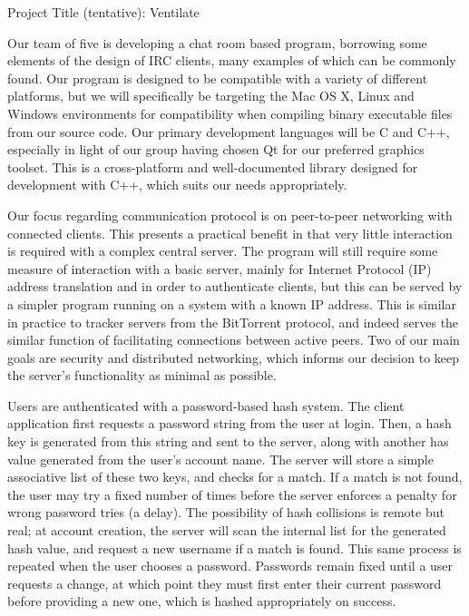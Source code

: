 \documentclass[12pt]{report}
\begin{document}
\begin{flushleft}

\begin{center}
Project Title (tentative): Ventilate
\end{center}

\setlength{\parindent}{1.27cm}

\indent \indent Our team of five is developing a chat room based program, borrowing some elements of the design of IRC clients, many examples of which can be commonly found. Our program is designed to be compatible with a variety of different platforms, but we will specifically be targeting the Mac OS X, Linux and Windows environments for compatibility when compiling binary executable files from our source code. Our primary development languages will be C and C++, especially in light of our group having chosen Qt for our preferred graphics toolset. This is a cross-platform and well-documented library designed for development with C++, which suits our needs appropriately.

\indent Our focus regarding communication protocol is on peer-to-peer networking with connected clients. This presents a practical benefit in that very little interaction is required with a complex central server. The program will still require some measure of interaction with a basic server, mainly for Internet Protocol (IP) address translation and in order to authenticate clients, but this can be served by a simpler program running on a system with a known IP address. This is similar in practice to tracker servers from the BitTorrent protocol, and indeed serves the similar function of facilitating connections between active peers. Two of our main goals are security and distributed networking, which informs our decision to keep the server's functionality as minimal as possible.

\indent Users are authenticated with a password-based hash system. The client application first requests a password string from the user at login. Then, a hash key is generated from this string and sent to the server, along with another has value generated from the user's account name. The server will store a simple associative list of these two keys, and checks for a match. If a match is not found, the user may try a fixed number of times before the server enforces a penalty for wrong password tries (a delay). The possibility of hash collisions is remote but real; at account creation, the server will scan the internal list for the generated hash value, and request a new username if a match is found. This same process is repeated when the user chooses a password. Passwords remain fixed until a user requests a change, at which point they must first enter their current password before providing a new one, which is hashed appropriately on success.%


\end{flushleft}
\end{document}
